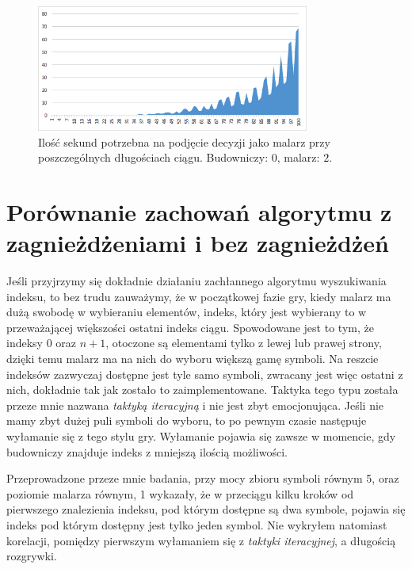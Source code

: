\documentclass[document]{xmgr}
\begin{document}
\begin{figure}[tbh]
    \centering
    \includegraphics[width = 0.8\textwidth]{images/timePainter2Builder0}
    \caption{Ilość sekund potrzebna na podjęcie decyzji jako malarz przy poszczególnych długościach ciągu. Budowniczy: $0$, malarz: $2$.}
    \label{fig:painter2builder0}
\end{figure}


\section{Porównanie zachowań algorytmu z zagnieżdżeniami i bez zagnieżdżeń}
Jeśli przyjrzymy się dokładnie działaniu zachłannego algorytmu wyszukiwania indeksu, to bez trudu zauważymy, że w początkowej fazie gry, kiedy malarz ma dużą swobodę w wybieraniu elementów, indeks, który jest wybierany to w przeważającej większości ostatni indeks ciągu. Spowodowane jest to tym, że indeksy 0 oraz $n+1$, otoczone są elementami tylko z lewej lub prawej strony, dzięki temu malarz ma na nich do wyboru większą gamę symboli. Na reszcie indeksów zazwyczaj dostępne jest tyle samo symboli, zwracany jest więc ostatni z nich, dokładnie tak jak zostało to zaimplementowane. Taktyka tego typu została przeze mnie nazwana \textit{taktyką iteracyjną} i nie jest zbyt emocjonująca. Jeśli nie mamy zbyt dużej puli symboli do wyboru, to po pewnym czasie następuje wyłamanie się z tego stylu gry. Wyłamanie pojawia się zawsze w momencie, gdy budowniczy znajduje indeks z mniejszą ilością możliwości. 

Przeprowadzone przeze mnie badania, przy mocy zbioru symboli równym 5, oraz poziomie malarza równym, 1 wykazały, że w przeciągu kilku kroków od pierwszego znalezienia indeksu, pod którym dostępne są dwa symbole, pojawia się indeks pod którym dostępny jest tylko jeden symbol. Nie wykryłem natomiast korelacji, pomiędzy pierwszym wyłamaniem się z \textit{taktyki iteracyjnej}, a długością rozgrywki. 
 
\end{document}
